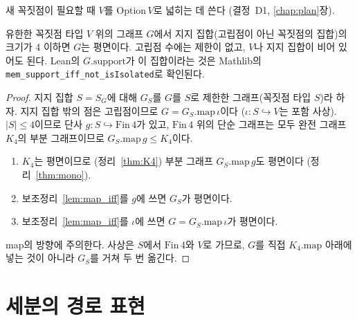 새 꼭짓점이 필요할 때 \(V\)를 \(\mathrm{Option}\,V\)로 넓히는 데 쓴다 (결정~D1, \ref{chap:plan}장).

\begin{lemma}
\label{lem:small}
\leanok
유한한 꼭짓점 타입 \(V\) 위의 그래프 \(G\)에서 지지 집합(고립점이 아닌 꼭짓점의 집합)의 크기가
4 이하면 \(G\)는 평면이다. 고립점 수에는 제한이 없고, \(V\)나 지지 집합이 비어 있어도 된다.
Lean의 \(G.\mathrm{support}\)가 이 집합이라는 것은 Mathlib의
\texttt{mem\_support\_iff\_not\_isIsolated}로 확인된다.
\end{lemma}

\begin{proof}
\leanok
지지 집합 \(S = S_G\)에 대해 \(G_S\)를 \(G\)를 \(S\)로 제한한 그래프(꼭짓점 타입 \(S\))라 하자. 지지 집합 밖의
점은 고립점이므로 \(G = G_S.\mathrm{map}\,\iota\)이다 (\(\iota : S \hookrightarrow V\)는 포함 사상).
\(|S| \le 4\)이므로 단사 \(g : S \hookrightarrow \mathrm{Fin}\,4\)가 있고, \(\mathrm{Fin}\,4\) 위의 단순 그래프는 모두
완전 그래프 \(K_4\)의 부분 그래프이므로 \(G_S.\mathrm{map}\,g \le K_4\)이다.
\begin{enumerate}
  \item \(K_4\)는 평면이므로 (정리~\ref{thm:K4}) 부분 그래프 \(G_S.\mathrm{map}\,g\)도 평면이다
        (정리~\ref{thm:mono}).
  \item 보조정리~\ref{lem:map_iff}를 \(g\)에 쓰면 \(G_S\)가 평면이다.
  \item 보조정리~\ref{lem:map_iff}를 \(\iota\)에 쓰면 \(G = G_S.\mathrm{map}\,\iota\)가 평면이다.
\end{enumerate}
map의 방향에 주의한다. 사상은 \(S\)에서 \(\mathrm{Fin}\,4\)와 \(V\)로 가므로, \(G\)를 직접
\(K_4.\mathrm{map}\) 아래에 넣는 것이 아니라 \(G_S\)를 거쳐 두 번 옮긴다.
\end{proof}

\section{세분의 경로 표현}

